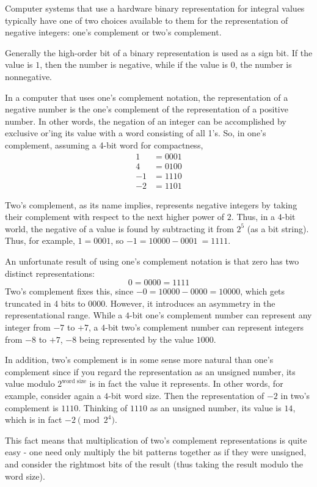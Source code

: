 \documentclass[12pt]{article}
\begin{document}
Computer systems that use a hardware binary representation for integral values typically have one of two choices available to them for the representation of negative integers: one's complement or two's complement.

Generally the high-order bit of a binary representation is used as a sign bit. If the value is $1$, then the number is negative, while if the value is $0$, the number is nonnegative.

In a computer that uses one's complement notation, the representation of a negative number is the one's complement of the representation of a positive number. In other words, the negation of an integer can be accomplished by exclusive or'ing its value with a word consisting of all 1's. So, in one's complement, assuming a 4-bit word for compactness,
\begin{align*}
1&=0001\\
4&=0100\\
-1&=1110\\
-2&=1101
\end{align*}

Two's complement, as its name implies, represents negative integers by taking their complement with respect to the next higher power of $2$. Thus, in a $4$-bit world, the negative of a value is found by subtracting it from $2^5$ (as a bit string). Thus, for example, $1=0001$, so $-1=10000-0001\ =1111$.

An unfortunate result of using one's complement notation is that zero has two distinct representations:
\[0=0000=1111\]
Two's complement fixes this, since $-0=10000-0000=10000$, which gets truncated in 4 bits to $0000$. However, it introduces an asymmetry in the representational range. While a $4$-bit one's complement number can represent any integer from $-7$ to $+7$, a $4$-bit two's complement number can represent integers from $-8$ to $+7$, $-8$ being represented by the value $1000$.

In addition, two's complement is in some sense more natural than one's complement since if you regard the representation as an unsigned number, its value modulo $2^{\text{word size}}$ is in fact the value it represents. In other words, for example, consider again a $4$-bit word size. Then the representation of $-2$ in two's complement is $1110$. Thinking of $1110$ as an unsigned number, its value is $14$, which is in fact $-2\pmod{2^4}$.

This fact means that multiplication of two's complement representations is quite easy - one need only multiply the bit patterns together as if they were unsigned, and consider the rightmost bits of the result (thus taking the result modulo the word size).
\end{document}

